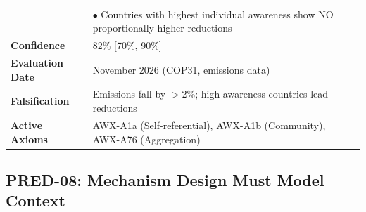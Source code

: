 \begin{table}[htbp]
\begin{tabular}{p{3cm}p{11cm}}
& $\bullet$ Countries with highest individual awareness show NO proportionally higher reductions \\
\textbf{Confidence} & 82\% [70\%, 90\%] \\
\textbf{Evaluation Date} & November 2026 (COP31, emissions data) \\
\textbf{Falsification} & Emissions fall by $>2\%$; high-awareness countries lead reductions \\
\textbf{Active Axioms} & AWX-A1a (Self-referential), AWX-A1b (Community), AWX-A76 (Aggregation) \\
\bottomrule
\end{tabular}
\end{table}


\subsection{PRED-08: Mechanism Design Must Model Context}
\label{subsec:pred-08-calc}

